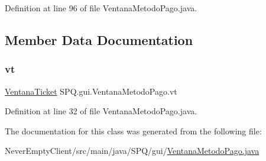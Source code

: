 Definition at line 96 of file Ventana\+Metodo\+Pago.\+java.



\subsection{Member Data Documentation}
\mbox{\label{class_s_p_q_1_1gui_1_1_ventana_metodo_pago_aaad8d1f40f23d404c13feabdbf63e248}} 
\subsubsection{\texorpdfstring{vt}{vt}}
{\footnotesize\ttfamily \mbox{\hyperlink{class_s_p_q_1_1gui_1_1_ventana_ticket}{Ventana\+Ticket}} S\+P\+Q.\+gui.\+Ventana\+Metodo\+Pago.\+vt}



Definition at line 32 of file Ventana\+Metodo\+Pago.\+java.



The documentation for this class was generated from the following file\+:\begin{DoxyCompactItemize}
\item 
Never\+Empty\+Client/src/main/java/\+S\+P\+Q/gui/\mbox{\hyperlink{_ventana_metodo_pago_8java}{Ventana\+Metodo\+Pago.\+java}}\end{DoxyCompactItemize}
